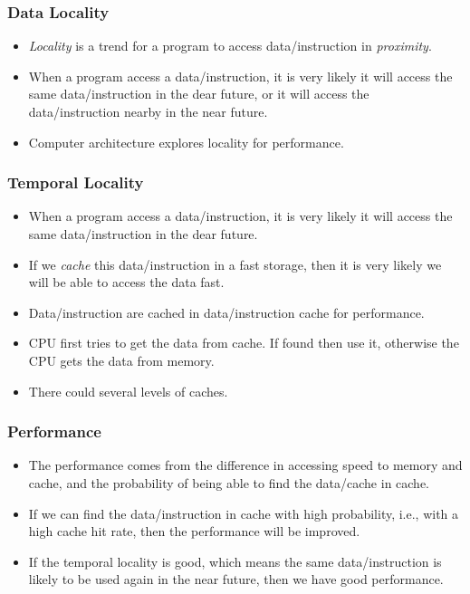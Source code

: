 \documentclass{beamer}
\begin{document}
\begin{CJK}{UTF8}{bsmi}
\begin{frame}
\frametitle{Data Locality}
\begin{itemize}
\item {\em Locality} is a trend for a program to access
  data/instruction in {\em proximity}.
\item When a program access a data/instruction, it is very likely it
  will access the same data/instruction in the dear future, or it will
  access the data/instruction nearby in the near future.
\item Computer architecture explores locality for performance.
\end{itemize}
\end{frame}

\begin{frame}
\frametitle{Temporal Locality} 
\begin{itemize}
\item When a program access a data/instruction, it is very likely it
  will access the same data/instruction in the dear future.
\item If we {\em cache} this data/instruction in a fast storage, then
  it is very likely we will be able to access the data fast.
\item Data/instruction are cached in data/instruction cache for
  performance.
\item CPU first tries to get the data from cache. If found then use
  it, otherwise the CPU gets the data from memory.
\item There could several levels of caches.
\end{itemize}
\end{frame}

\begin{frame}
\frametitle{Performance}
\begin{itemize}
\item The performance comes from the difference in accessing speed to
  memory and cache, and the probability of being able to find the
  data/cache in cache.
\item If we can find the data/instruction in cache with high
  probability, i.e., with a high cache hit rate, then the performance
  will be improved.
\item If the temporal locality is good, which means the same
  data/instruction is likely to be used again in the near future, then
  we have good performance.
\end{itemize}
\end{frame}


\end{CJK}
\end{document}
